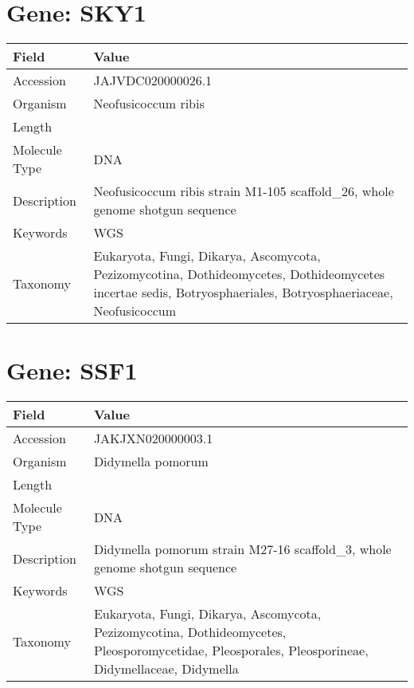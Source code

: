 \documentclass[10pt]{article}
\begin{document}
\section*{Gene: SKY1}
{\footnotesize
\begin{longtable}{>{\raggedright\arraybackslash}p{4.5cm} >{\raggedright\arraybackslash}p{11.5cm}}
\textbf{Field} & \textbf{Value} \\
\hline
Accession & JAJVDC020000026.1 \\
Organism & Neofusicoccum ribis \\
Length & 307156 \\
Molecule Type & DNA \\
Description & Neofusicoccum ribis strain M1-105 scaffold\_26, whole genome shotgun sequence \\
Keywords & WGS \\
Taxonomy & Eukaryota, Fungi, Dikarya, Ascomycota, Pezizomycotina, Dothideomycetes, Dothideomycetes incertae sedis, Botryosphaeriales, Botryosphaeriaceae, Neofusicoccum \\
\end{longtable}
}


\section*{Gene: SSF1}
{\footnotesize
\begin{longtable}{>{\raggedright\arraybackslash}p{4.5cm} >{\raggedright\arraybackslash}p{11.5cm}}
\textbf{Field} & \textbf{Value} \\
\hline
Accession & JAKJXN020000003.1 \\
Organism & Didymella pomorum \\
Length & 1050547 \\
Molecule Type & DNA \\
Description & Didymella pomorum strain M27-16 scaffold\_3, whole genome shotgun sequence \\
Keywords & WGS \\
Taxonomy & Eukaryota, Fungi, Dikarya, Ascomycota, Pezizomycotina, Dothideomycetes, Pleosporomycetidae, Pleosporales, Pleosporineae, Didymellaceae, Didymella \\
\end{longtable}
}
\end{document}
